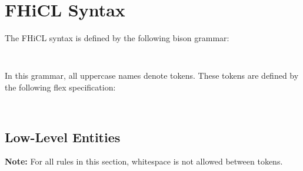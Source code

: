 \documentclass{memarticle}
\begin{document}
\chapter{FHiCL Syntax}{

        The FHiCL syntax is defined by the following bison grammar:
        \begin{verbatim}
        
        \end{verbatim}

        In this grammar,
        all uppercase names denote tokens.
        These tokens are defined by the following flex specification:
        \begin{verbatim}
        
        \end{verbatim}

        \section{Low-Level Entities}
                \textbf{ Note: } For all rules in this section,
                whitespace is not allowed between tokens.
}
\end{document}
